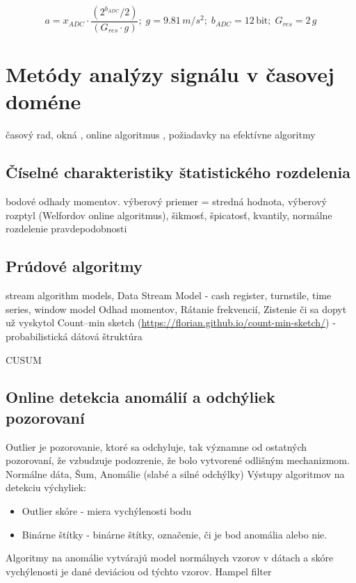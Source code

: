 \begin{equation}
a = x_{ADC} \cdot \frac{(2^{b_{ADC}} / 2)}{(G_{res} \cdot g)};\; g = 9.81\,m/s^2;\; b_{ADC} = 12\,\mathrm{bit};\; G_{res} = 2\,g
\end{equation}

\section{Metódy analýzy signálu v časovej doméne}
časový rad, okná
\cite{time-series-analysis} \cite{practical-time-series} \cite{generalized-esd} \cite{twitter-esd}, 
online algoritmus \cite{online-anomaly-detection}, 
požiadavky na efektívne algoritmy
	

\subsection{Číselné charakteristiky štatistického rozdelenia}
bodové odhady momentov. výberový priemer = stredná hodnota, výberový rozptyl (Welfordov online algoritmus), šikmosť, špicatosť, kvantily, normálne rozdelenie pravdepodobnosti

\subsection{Prúdové algoritmy}
stream algorithm models, Data Stream Model - cash register, turnstile, time series, window model
Odhad momentov, Rátanie frekvencií, Zistenie či sa dopyt už vyskytol
Count–min sketch (\url{https://florian.github.io/count-min-sketch/}) - probabilistická dátová štruktúra

CUSUM


\subsection{Online detekcia anomálií a odchýliek pozorovaní}
Outlier je pozorovanie, ktoré sa odchyluje, tak významne od ostatných pozorovaní, že vzbudzuje
podozrenie, že bolo vytvorené odlišným mechanizmom. Normálne dáta, Šum, Anomálie (slabé a silné odchýlky)
Výstupy algoritmov na detekciu výchyliek: 
\begin{itemize}
\itemsep0pt
\item Outlier skóre - miera vychýlenosti bodu
\item Binárne štítky - binárne štítky, označenie, či je bod anomália alebo nie.
\end{itemize}
Algoritmy na anomálie vytvárajú model normálnych vzorov v dátach a skóre vychýlenosti je dané deviáciou od týchto vzorov.
\cite{outlier-analysis} 
Hampel filter

